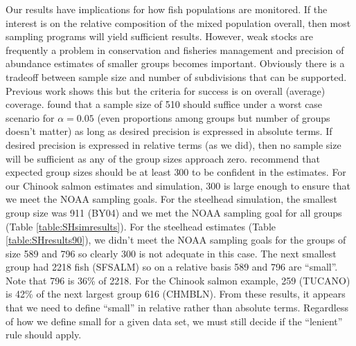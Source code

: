 \documentclass[%
                leqno,         %
%
]{nrc1}                          %
\begin{document}
Our results have implications for how fish populations are monitored. If the interest is on the relative composition of the  mixed population overall, then most sampling programs will yield sufficient results. However, weak stocks are frequently a problem in conservation and fisheries management and precision of abundance estimates of smaller groups becomes important.  Obviously there is a tradeoff between sample size and number of subdivisions that can be supported. Previous work \citep{Gerritsen} shows this but the criteria for success is on overall (average) coverage. \citet{Thompson1987} found that a sample size of 510 should suffice under a worst case scenario for $\alpha=0.05$ (even proportions among groups but number of groups doesn't matter) as long as desired precision is expressed in absolute terms. If desired precision is expressed in relative terms (as we did), then no sample size will be sufficient as any of the group sizes approach zero. \citet{Steinhorst2010} recommend that expected group sizes should be at least 300 to be confident in the estimates. For our Chinook salmon estimates and simulation, 300 is large enough to ensure that we meet the NOAA sampling goals.  For the steelhead simulation, the smallest group size was 911 (BY04) and we met the NOAA sampling goal for all groups (Table \ref{table:SHsimresults}).  For the steelhead estimates (Table \ref{table:SHresults90}), we didn't meet the NOAA sampling goals for the groups of size 589 and 796 so clearly 300 is not adequate in this case. The next smallest group had 2218 fish (SFSALM) so on a relative basis 589 and 796 are ``small''.  Note that 796 is 36\% of 2218.  For the Chinook salmon example, 259 (TUCANO) is 42\% of the next largest group 616 (CHMBLN).  From these results, it appears that we need to define ``small'' in relative rather than absolute terms.  Regardless of how we define small for a given data set, we must still decide if the ``lenient'' rule should apply.
\end{document}
